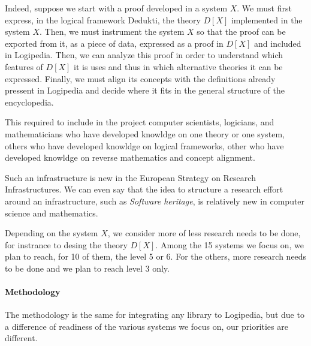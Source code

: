 Indeed, suppose we start with a proof developed in a system $X$. We
must first express, in the logical framework {\sc Dedukti}, the theory
$D[X]$ implemented in the system $X$. Then, we must instrument the
system $X$ so that the proof can be exported from it, as a piece of
data, expressed as a proof in $D[X]$ and included in {\sc
Logipedia}.  Then, we can analyze this proof in order to understand
which features of $D[X]$ it is uses and thus in which alternative
theories it can be expressed.  Finally, we must align its concepts with
the definitions already pressent in {\sc Logipedia} and decide where
it fits in the general structure of the encyclopedia.

This required to include in the project computer scientists,
logicians, and mathematicians who have developed knowldge on one
theory or one system, others who have developed knowldge on logical
frameworks, other who have developed knowldge on reverse mathematics
and concept alignment.

Such an infrastructure is new in the European Strategy on Research
Infrastructures. We can even say that the idea to structure a research
effort around an infrastructure, such as {\em Software heritage}, is
relatively new in computer science and mathematics.

Depending on the system $X$, we consider more of less research needs
to be done, for instrance to desing the theory $D[X]$. Among the 15
systems we focus on, we plan to reach, for 10 of them, the level 5 or
6. For the others, more research needs to be done and we plan to reach
level 3 only.

\paragraph{Methodology}

The methodology is the same for integrating any library to {\sc Logipedia},
but due to a difference of readiness of the various systems we focus on,
our priorities are different.

